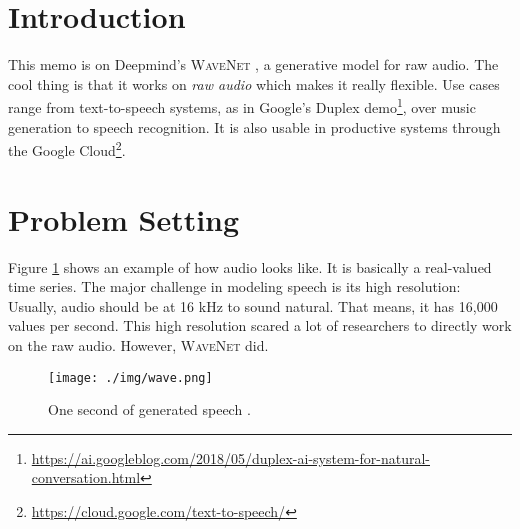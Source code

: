 \section{Introduction}
\label{sec:introduction}
This memo is on Deepmind's \textsc{WaveNet} \parencite{oord_wavenet:_2016}, a generative model for raw audio. The cool thing is that it works on \textit{raw audio} which makes it really flexible. Use cases range from text-to-speech systems, as in Google's Duplex demo\footnote{\url{https://ai.googleblog.com/2018/05/duplex-ai-system-for-natural-conversation.html}}, over music generation \parencite{mor_universal_2018} to speech recognition. It is also usable in productive systems through the Google Cloud\footnote{\url{https://cloud.google.com/text-to-speech/}}. 

\section{Problem Setting}
\label{sec:problem-setting}
Figure \ref{fig:wave} shows an example of how audio looks like. It is basically a real-valued time series. The major challenge in modeling speech is its high resolution: Usually, audio should be at 16 kHz to sound natural. That means, it has 16,000 values per second. This high resolution scared a lot of researchers to directly work on the raw audio. However, \textsc{WaveNet} did.\\

\begin{figure}[h]
	\centering
		\texttt{[image: ./img/wave.png]}
	\caption{One second of generated speech \parencite{oord_wavenet:_2016}.}
	\label{fig:wave}
\end{figure}

